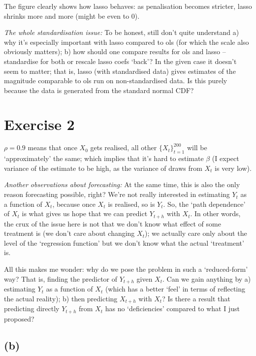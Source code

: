 \documentclass[a4paper,12pt,twoside]{article}
\begin{document}
The figure clearly shows how lasso behaves: as penalisation becomes stricter, lasso shrinks more and more (might be even to $0$).


\textit{The whole standardisation issue:} To be honest, still don't quite understand a) why it's especially important with lasso compared to ols (for which the scale also obviously matters); b) how should one compare results for ols and lasso -- standardise for both or rescale lasso coefs `back'? In the given case it doesn't seem to matter; that is, lasso (with standardised data) gives estimates of the magnitude comparable to ols run on non-standardised data. Is this purely because the data is generated from the standard normal CDF?


\section*{Exercise 2}

$\rho = 0.9$ means that once $X_0$ gets realised, all other $\{X_t\}_{t = 1}^{200}$ will be `approximately' the same; which implies that it's hard to estimate $\beta$ (I expect variance of the estimate to be high, as the variance of draws from $X_t$ is very low).

\textit{Another observations about forecasting:} At the same time, this is also the only reason forecasting possible, right? We're not really interested in estimating $Y_t$ as a function of $X_t$, because once $X_t$ is realised, so is $Y_t$. So, the `path dependence' of $X_t$ is what gives us hope that we can predict $Y_{t + h}$ with $X_t$. In other words, the crux of the issue here is not that we don't know what effect of some treatment is (we don't care about changing $X_t$); we actually care only about the level of the `regression function' but we don't know what the actual `treatment' is.

All this makes me wonder: why do we pose the problem in such a `reduced-form' way? That is, finding the predictor of $Y_{t + h}$ given $X_t$. Can we gain anything by a) estimating $Y_t$ as a function of $X_t$ (which has a better `feel' in terms of reflecting the actual reality); b) then predicting $X_{t + h}$ with $X_t$? Is there a result that predicting directly $Y_{t + h}$ from $X_t$ has no `deficiencies' compared to what I just proposed?

\subsection*{(b)}
\end{document}
